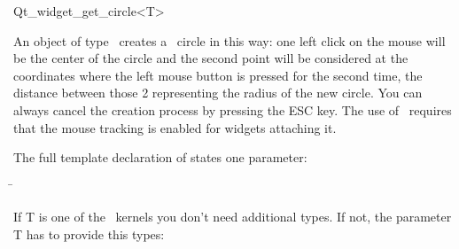 
\begin{ccRefClass}{Qt_widget_get_circle<T>}

\ccDefinition
An object of type \ccRefName\ creates a \cgal\ circle in this way: one 
left click on the mouse will be the center of the circle and the
second point will be considered at the coordinates where the left
mouse button is pressed for the second time, the distance
between those 2 representing the radius of the new circle.
You can always cancel the creation process by pressing the ESC key.
The use of \ccRefName\ requires that the mouse tracking is
enabled for widgets attaching it.


\ccParameters

The full template declaration of  states one parameter:

\begin{tabbing}
 \=\\
\end{tabbing}

If T is one of the \cgal\ kernels you don't need additional types. If
not, the parameter T has to provide this types:

\ccTypes
{}

\ccInheritsFrom
{}

\ccGlue

\ccCreation
{}


\end{ccRefClass}









